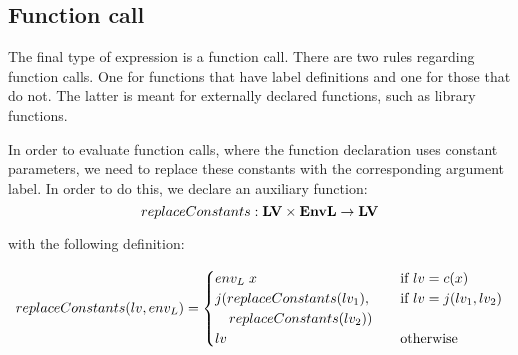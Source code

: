 \subsection{Function call}
The final type of expression is a function call.
There are two rules regarding function calls.
One for functions that have label definitions and one for those that do not.
The latter is meant for externally declared functions, such as library functions.

In order to evaluate function calls, where the function declaration uses constant parameters, we need to replace these constants with the corresponding argument label.
In order to do this, we declare an auxiliary function:
\[ replaceConstants : \mathbf{LV} \times \mathbf{EnvL} \rightarrow \mathbf{LV} \]

with the following definition:

\[replaceConstants(lv, {env_L}) = \begin{cases}
  {env_L} \; x & \quad \text{if } lv = c(x) \\
  j(replaceConstants(lv_1), & \quad \text{if } lv = j(lv_1, lv_2) \\
  \quad replaceConstants(lv_2)) & \\
  lv & \quad \text{otherwise}
\end{cases} \]


